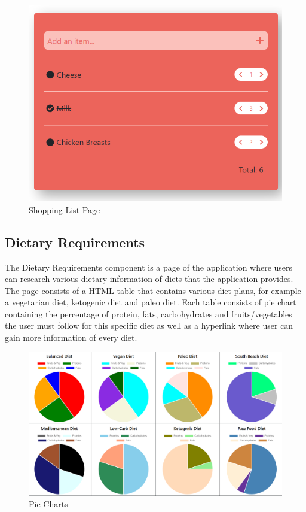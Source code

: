 \begin{center}
  \begin{figure}[H]
    \includegraphics[width=\textwidth]{img/shoplist.png}
    \caption{Shopping List Page}
    \label{fig: Image of Shopping List Page}
  \end{figure}
\end{center}

\subsection{Dietary Requirements}

The Dietary Requirements component is a page of the application where users can research various dietary information of diets that the application provides. The page consists of a HTML table that contains various diet plans, for example a vegetarian diet, ketogenic diet and paleo diet. Each table consists of pie chart containing the percentage of protein, fats, carbohydrates and fruits/vegetables the user must follow for this specific diet as well as a hyperlink where user can gain more information of every diet.

\begin{center}
  \begin{figure}[H]
    \includegraphics[width=\textwidth]{img/charts.png}
    \caption{Pie Charts}
    \label{fig: Image of Dietary Charts}
  \end{figure}
\end{center}

